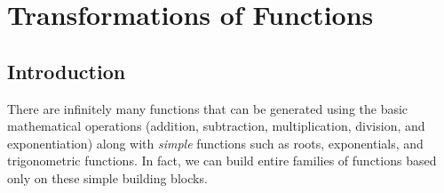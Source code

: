 \section{Transformations of Functions} \label{S:0.3.Transformations}


\vspace*{-14 pt}



\nin \hrulefill


\subsection*{Introduction}
There are infinitely many functions that can be generated using the basic mathematical
operations (addition, subtraction, multiplication, division, and exponentiation) along
with {\it simple} functions such as roots, exponentials, and trigonometric functions.  In
fact, we can build entire families of functions based only on these simple building
blocks.




